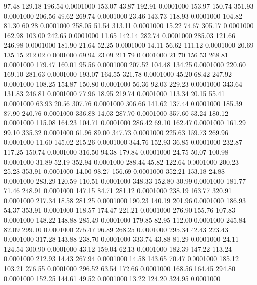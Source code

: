   97.48  129.18  196.54   0.0001000
 153.07   43.87  192.91   0.0001000
 153.97  150.74  351.93   0.0001000
 206.56   49.62  269.74   0.0001000
  23.46  143.73  118.93   0.0001000
 104.82   81.30   60.28   0.0001000
 258.05   51.54  313.11   0.0001000
  15.22   74.67  305.17   0.0001000
 162.98  103.00  242.65   0.0001000
  11.65  142.14  282.74   0.0001000
 285.03  121.66  246.98   0.0001000
 181.90   21.64   52.25   0.0001000
  14.11   56.62  111.12   0.0001000
  20.69  135.15  212.02   0.0001000
  69.94   23.09  211.79   0.0001000
  21.70  156.53  268.81   0.0001000
 179.47  160.01   95.56   0.0001000
 207.52  104.48  134.25   0.0001000
 220.60  169.10  281.63   0.0001000
 193.07  164.55  321.78   0.0001000
  45.20   68.42  247.92   0.0001000
 108.25  154.87  150.80   0.0001000
  56.36   92.03  229.23   0.0001000
 343.64  131.83  246.81   0.0001000
  77.96   18.95  219.74   0.0001000
 113.34   20.15   55.41   0.0001000
  63.93   20.56  307.76   0.0001000
 306.66  141.62  137.44   0.0001000
 185.39   87.90  240.76   0.0001000
 336.88   14.03  287.70   0.0001000
 357.60   53.24  180.12   0.0001000
 115.08  164.23  104.71   0.0001000
 286.42   69.10  162.47   0.0001000
 161.29   99.10  335.32   0.0001000
  61.96   89.00  347.73   0.0001000
 225.63  159.73  269.96   0.0001000
  11.60  145.02  215.26   0.0001000
 344.76  152.93   36.85   0.0001000
 232.87  117.25  150.74   0.0001000
 316.50   94.38  179.84   0.0001000
  24.75   50.07  100.98   0.0001000
  31.89   52.19  352.94   0.0001000
 288.44   45.82  122.64   0.0001000
 200.23   25.28  353.91   0.0001000
  14.00   98.27  156.69   0.0001000
 352.21  153.18   24.88   0.0001000
 283.29  120.59  110.51   0.0001000
 348.33  152.80   30.99   0.0001000
 181.77   71.46  248.91   0.0001000
 147.15   84.71  281.12   0.0001000
 238.19  163.77  320.91   0.0001000
 217.34   18.58  281.25   0.0001000
 190.23  140.19  201.96   0.0001000
 186.93   54.37  353.91   0.0001000
 118.57  174.47  221.21   0.0001000
 276.90  155.76  107.83   0.0001000
 148.22  148.88  285.49   0.0001000
 179.85   82.95  112.00   0.0001000
 245.84   82.09  299.10   0.0001000
 275.47   96.89  268.25   0.0001000
 295.34   42.43  223.43   0.0001000
 317.28  143.88  238.70   0.0001000
 333.74   43.88   81.29   0.0001000
  24.11  124.54  300.90   0.0001000
  43.12  159.04   62.13   0.0001000
 182.39  147.22  113.24   0.0001000
 212.93   14.43  267.94   0.0001000
  14.58  143.65   70.47   0.0001000
 185.12  103.21  276.55   0.0001000
 296.52   63.54  172.66   0.0001000
 168.56  164.45  294.80   0.0001000
 152.25  144.61   49.52   0.0001000
  13.22  124.20  324.95   0.0001000
